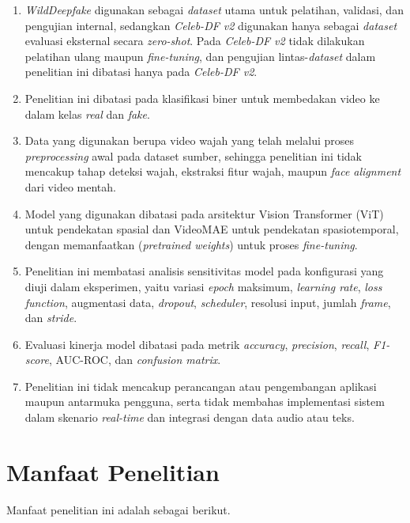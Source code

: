 \begin{enumerate}[noitemsep]
	\item \textit{WildDeepfake} digunakan sebagai \textit{dataset} utama untuk pelatihan, validasi, dan pengujian internal, sedangkan \textit{Celeb-DF v2} digunakan hanya sebagai \textit{dataset} evaluasi eksternal secara \textit{zero-shot}. Pada \textit{Celeb-DF v2} tidak dilakukan pelatihan ulang maupun \textit{fine-tuning}, dan pengujian lintas-\textit{dataset} dalam penelitian ini dibatasi hanya pada \textit{Celeb-DF v2}.
	\item Penelitian ini dibatasi pada klasifikasi biner untuk membedakan video ke dalam kelas \textit{real} dan \textit{fake}.
	\item Data yang digunakan berupa video wajah yang telah melalui proses \textit{preprocessing} awal pada dataset sumber, sehingga penelitian ini tidak mencakup tahap deteksi wajah, ekstraksi fitur wajah, maupun \textit{face alignment} dari video mentah.
	\item Model yang digunakan dibatasi pada arsitektur Vision Transformer (ViT) untuk pendekatan spasial dan VideoMAE untuk pendekatan spasiotemporal, dengan memanfaatkan (\textit{pretrained weights}) untuk proses \textit{fine-tuning}.
	\item Penelitian ini membatasi analisis sensitivitas model pada konfigurasi yang diuji dalam eksperimen, yaitu variasi \textit{epoch} maksimum, \textit{learning rate}, \textit{loss function}, augmentasi data, \textit{dropout}, \textit{scheduler}, resolusi input, jumlah \textit{frame}, dan \textit{stride}.
	\item Evaluasi kinerja model dibatasi pada metrik \textit{accuracy}, \textit{precision}, \textit{recall}, \textit{F1-score}, AUC-ROC, dan \textit{confusion matrix}.
	\item Penelitian ini tidak mencakup perancangan atau pengembangan aplikasi maupun antarmuka pengguna, serta tidak membahas implementasi sistem dalam skenario \textit{real-time} dan integrasi dengan data audio atau teks.
\end{enumerate}

\section{Manfaat Penelitian} \label{I.Manfaat}
Manfaat penelitian ini adalah sebagai berikut. \par

